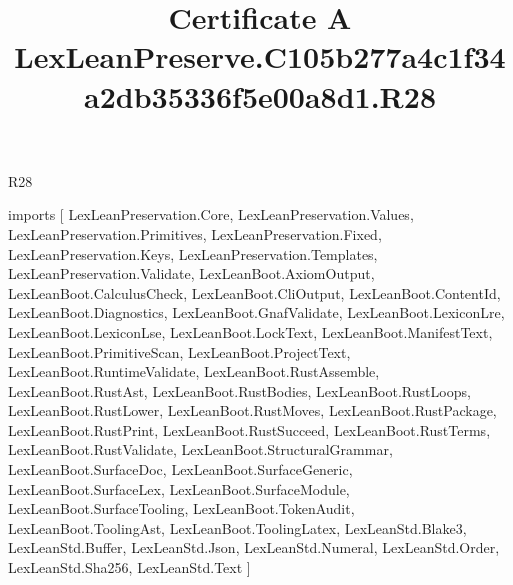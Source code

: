 \begin{lexlean}{R28}
\title{Certificate A LexLeanPreserve.C105b277a4c1f34a2db35336f5e00a8d1.R28}
\begin{coremodule}
imports [
  LexLeanPreservation.Core,
  LexLeanPreservation.Values,
  LexLeanPreservation.Primitives,
  LexLeanPreservation.Fixed,
  LexLeanPreservation.Keys,
  LexLeanPreservation.Templates,
  LexLeanPreservation.Validate,
  LexLeanBoot.AxiomOutput,
  LexLeanBoot.CalculusCheck,
  LexLeanBoot.CliOutput,
  LexLeanBoot.ContentId,
  LexLeanBoot.Diagnostics,
  LexLeanBoot.GnafValidate,
  LexLeanBoot.LexiconLre,
  LexLeanBoot.LexiconLse,
  LexLeanBoot.LockText,
  LexLeanBoot.ManifestText,
  LexLeanBoot.PrimitiveScan,
  LexLeanBoot.ProjectText,
  LexLeanBoot.RuntimeValidate,
  LexLeanBoot.RustAssemble,
  LexLeanBoot.RustAst,
  LexLeanBoot.RustBodies,
  LexLeanBoot.RustLoops,
  LexLeanBoot.RustLower,
  LexLeanBoot.RustMoves,
  LexLeanBoot.RustPackage,
  LexLeanBoot.RustPrint,
  LexLeanBoot.RustSucceed,
  LexLeanBoot.RustTerms,
  LexLeanBoot.RustValidate,
  LexLeanBoot.StructuralGrammar,
  LexLeanBoot.SurfaceDoc,
  LexLeanBoot.SurfaceGeneric,
  LexLeanBoot.SurfaceLex,
  LexLeanBoot.SurfaceModule,
  LexLeanBoot.SurfaceTooling,
  LexLeanBoot.TokenAudit,
  LexLeanBoot.ToolingAst,
  LexLeanBoot.ToolingLatex,
  LexLeanStd.Blake3,
  LexLeanStd.Buffer,
  LexLeanStd.Json,
  LexLeanStd.Numeral,
  LexLeanStd.Order,
  LexLeanStd.Sha256,
  LexLeanStd.Text
]


\end{coremodule}
\end{lexlean}
